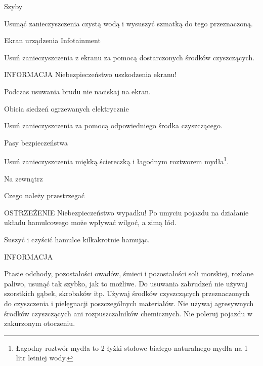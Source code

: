 Szyby

\begin{itemizeArrow}
	\itemArrow Usunąć zanieczyszczenia czystą wodą i wysuszyć szmatką do tego przeznaczoną.
\end{itemizeArrow}

Ekran urządzenia Infotainment

\begin{itemizeArrow}
	\itemArrow Usuń zanieczyszczenia z ekranu za pomocą dostarczonych środków czyszczących.
\end{itemizeArrow}

INFORMACJA
Niebezpieczeństwo uszkodzenia ekranu!
\begin{itemizeTriangle}
	\itemTriangle Podczas usuwania brudu nie naciskaj na ekran.
\end{itemizeTriangle}

Obicia siedzeń ogrzewanych elektrycznie

\begin{itemizeArrow}
	\itemArrow Usuń zanieczyszczenia za pomocą odpowiedniego środka czyszczącego.
\end{itemizeArrow}

Pasy bezpieczeństwa

\begin{itemizeArrow}
	\itemArrow Usuń zanieczyszczenia miękką ściereczką i łagodnym roztworem mydła\footnote{Łagodny roztwór mydła to 2 łyżki stołowe białego naturalnego mydła na 1 litr letniej wody.}.
\end{itemizeArrow}

Na zewnątrz

Czego należy przestrzegać

OSTRZEŻENIE
Niebezpieczeństwo wypadku!
Po umyciu pojazdu na działanie układu hamulcowego może wpływać wilgoć, a zimą lód.
\begin{itemizeTriangle}
	\itemTriangle Suszyć i czyścić hamulce kilkakrotnie hamując.
\end{itemizeTriangle}

INFORMACJA
\begin{itemizeTriangle}
	\itemTriangle Ptasie odchody, pozostałości owadów, śmieci i pozostałości soli morskiej, rozlane paliwo, usunąć tak szybko, jak to możliwe.
	\itemTriangle Do usuwania zabrudzeń nie używaj szorstkich gąbek, skrobaków itp.
	\itemTriangle Używaj środków czyszczących przeznaczonych do czyszczenia i pielęgnacji poszczególnych materiałów.
	\itemTriangle Nie używaj agresywnych środków czyszczących ani rozpuszczalników chemicznych.
	\itemTriangle Nie poleruj pojazdu w zakurzonym otoczeniu.
\end{itemizeTriangle}

